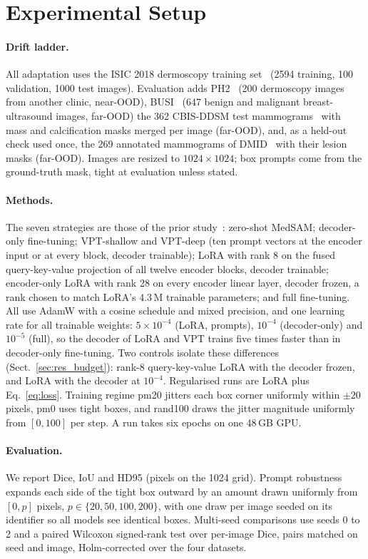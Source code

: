 \section{Experimental Setup}
\label{sec:setup}

\paragraph{Drift ladder.}
All adaptation uses the ISIC 2018 dermoscopy training set~\cite{codella2019isic} (2594 training, 100 validation, 1000 test images). Evaluation adds PH2~\cite{mendonca2013ph2} (200 dermoscopy images from another clinic, near-OOD), BUSI~\cite{aldhabyani2020busi} (647 benign and malignant breast-ultrasound images, far-OOD) the 362 CBIS-DDSM test mammograms~\cite{lee2017cbis} with mass and calcification masks merged per image (far-OOD), and, as a held-out check used once, the 269 annotated mammograms of DMID~\cite{oza2024dmid} with their lesion masks (far-OOD). Images are resized to $1024 \times 1024$; box prompts come from the ground-truth mask, tight at evaluation unless stated.

\paragraph{Methods.}
The seven strategies are those of the prior study~\cite{prior2026safer}: zero-shot MedSAM; decoder-only fine-tuning; VPT-shallow and VPT-deep (ten prompt vectors at the encoder input or at every block, decoder trainable); LoRA with rank 8 on the fused query-key-value projection of all twelve encoder blocks, decoder trainable; encoder-only LoRA with rank 28 on every encoder linear layer, decoder frozen, a rank chosen to match LoRA's 4.3\,M trainable parameters; and full fine-tuning. All use AdamW with a cosine schedule and mixed precision, and one learning rate for all trainable weights: $5 \times 10^{-4}$ (LoRA, prompts), $10^{-4}$ (decoder-only) and $10^{-5}$ (full), so the decoder of LoRA and VPT trains five times faster than in decoder-only fine-tuning. Two controls isolate these differences (Sect.~\ref{sec:res_budget}): rank-8 query-key-value LoRA with the decoder frozen, and LoRA with the decoder at $10^{-4}$. Regularised runs are LoRA plus Eq.~\eqref{eq:loss}. Training regime pm20 jitters each box corner uniformly within $\pm 20$ pixels, pm0 uses tight boxes, and rand100 draws the jitter magnitude uniformly from $[0, 100]$ per step. A run takes six epochs on one 48\,GB GPU.

\paragraph{Evaluation.}
We report Dice, IoU and HD95 (pixels on the 1024 grid). Prompt robustness expands each side of the tight box outward by an amount drawn uniformly from $[0, p]$ pixels, $p \in \{20, 50, 100, 200\}$, with one draw per image seeded on its identifier so all models see identical boxes. Multi-seed comparisons use seeds 0 to 2 and a paired Wilcoxon signed-rank test over per-image Dice, pairs matched on seed and image, Holm-corrected over the four datasets.
